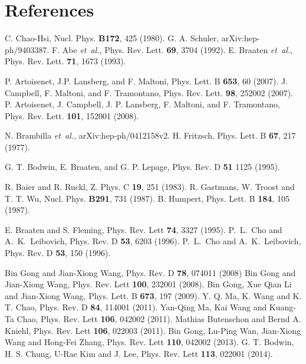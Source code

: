 \documentclass{iopart}
\begin{document}
\section*{References}
\begin{thebibliography}{50}
\medskip
{} C. Chao-Hsi, Nucl. Phys. {\bf B172}, 425 (1980).
 G. A. Schuler, arXiv:hep-ph/9403387.%
 F. Abe {\em et~al.},  Phys. Rev. Lett. {\bf 69}, 3704 (1992).
 E. Braaten {\em et~al.}, Phys. Rev. Lett. {\bf 71}, 1673 (1993).

 P. Artoisenet, J.P. Lansberg, and F. Maltoni, Phys. Lett. B {\bf 653}, 60 (2007).
 J. Campbell, F. Maltoni, and F. Tramontano, Phys. Rev. Lett. {\bf 98}, 252002 (2007).
 P. Artoisenet, J. Campbell, J. P. Lansberg, F. Maltoni, and F. Tramontano, Phys. Rev. Lett. {\bf 101}, 152001 (2008).


 N. Brambilla {\em et~al.}, arXiv:hep-ph/0412158v2.
 H. Fritzsch,  Phys. Lett. B {\bf 67}, 217 (1977).


 G. T. Bodwin, E. Braaten, and G. P. Lepage,  Phys. Rev. D {\bf 51} 1125 (1995).

 R. Baier and R. Ruckl, Z. Phys. C {\bf19}, 251 (1983).
 R. Gastmans, W. Troost and T. T. Wu, Nucl. Phys. {\bf B291}, 731 (1987). 
 B. Humpert, Phys. Lett. B {\bf 184}, 105 (1987).

 E. Braaten and S. Fleming, Phys. Rev. Lett {\bf 74}, 3327 (1995).
 P.~L.~Cho and A.~K.~Leibovich, Phys. Rev. D {\bf 53}, 6203 (1996).
 P.~L.~Cho and A.~K.~Leibovich, Phys. Rev. D {\bf 53}, 150 (1996).

 Bin Gong and Jian-Xiong Wang, Phys. Rev. D {\bf 78}, 074011 (2008)
 Bin Gong and Jian-Xiong Wang, Phys. Rev. Lett {\bf 100}, 232001 (2008).
 Bin Gong, Xue Qian Li and Jian-Xiong Wang, Phys. Lett. B {\bf 673}, 197 (2009).
 Y. Q. Ma, K. Wang and K. T. Chao, Phys. Rev. D {\bf 84}, 114001 (2011).
 Yan-Qing Ma, Kai Wang and Kuang-Ta Chao, Phys. Rev. Lett {\bf 106}, 042002 (2011).
 Mathias Butenschon and Bernd A. Kniehl, Phys. Rev. Lett {\bf 106}, 022003 (2011).
 Bin Gong, Lu-Ping Wan, Jian-Xiong Wang and Hong-Fei Zhang, Phys. Rev. Lett {\bf 110}, 042002 (2013).
 G. T. Bodwin, H. S. Chung, U-Rae Kim and J. Lee, Phys. Rev. Lett {\bf 113}, 022001 (2014).


\end{thebibliography}
\end{document}
